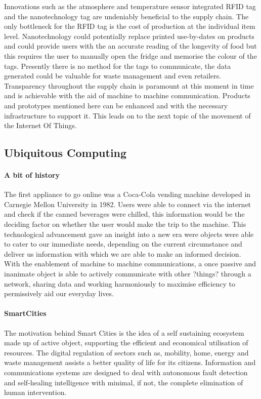 \documentclass[a4paper, 11pt]{article}
\begin{document}
Innovations such as the atmosphere and temperature sensor integrated RFID tag and the nanotechnology tag are undeniably beneficial to the supply chain. The only bottleneck for the RFID  tag is the cost of production at the individual item level. Nanotechnology could potentially replace printed use-by-dates on products  and could provide users with the an accurate reading of the longevity of food but this requires the user to manually open the fridge and memorise the colour of the tags. Presently there is no method for the tags to communicate, the data generated could be valuable for waste management and even retailers. Transparency throughout the supply chain is paramount at this moment in time and is achievable with the aid of machine to machine communication. Products and prototypes mentioned here can be enhanced and with the necessary infrastructure to support it. This leads on to the next topic of the movement of the Internet Of Things. 

\vspace{\baselineskip}
\vspace{\baselineskip}
\vspace{\baselineskip}


\subsection{Ubiquitous Computing}
\paragraph{A bit of history} The first appliance to go online was a Coca-Cola vending machine developed in Carnegie Mellon University in 1982. Users were able to connect via the internet and check if the canned beverages were chilled, this information would be the deciding factor on whether the user would make the trip to the machine. This technological advancement gave an insight into a new era were objects were able to cater to our immediate needs, depending on the current circumstance and deliver us information with which we are able to make an informed decision. With the enablement of machine to machine communications, a once passive and inanimate object is able to actively communicate with other ?things? through a network, sharing data and working harmoniously to maximise efficiency to permissively aid our everyday lives.

\paragraph{SmartCities} The motivation behind Smart Cities is the idea of a self sustaining ecosystem made up of active object, supporting the efficient and economical utilisation of resources. The digital regulation of sectors such as, mobility, home, energy and waste management assists a better quality of life for its citizens. Information and communications systems are designed to deal with autonomous fault detection and self-healing intelligence with minimal, if not, the complete elimination of human intervention. 
\end{document}
